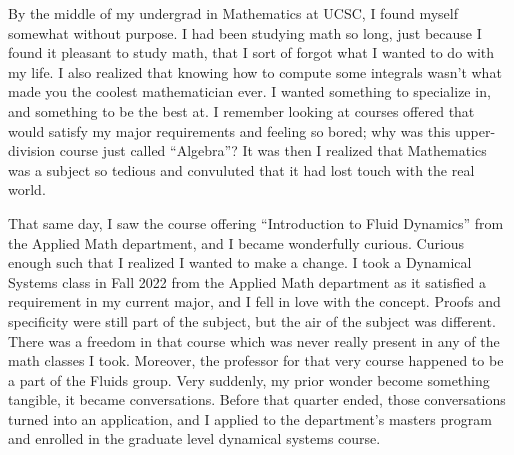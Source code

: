 \documentclass{article}
\begin{document}

By the middle of my undergrad in Mathematics at UCSC, I found myself somewhat without purpose. I had been studying math so long, just because I found it pleasant to study math, that I sort of forgot what I wanted to do with my life. I also realized that knowing how to compute some integrals wasn't what made you the coolest mathematician ever. I wanted something to specialize in, and something to be the best at. I remember looking at courses offered that would satisfy my major requirements and feeling so bored; why was this upper-division course just called ``Algebra''? It was then I realized that Mathematics was a subject so tedious and convuluted that it had lost touch with the real world. 

That same day, I saw the course offering ``Introduction to Fluid Dynamics'' from the Applied Math department, and I became wonderfully curious.  Curious enough such that I realized I wanted to make a change. I took a Dynamical Systems class in Fall 2022 from the Applied Math department as it satisfied a requirement in my current major, and I fell in love with the concept. Proofs and specificity were still part of the subject, but the air of the subject was different. There was a freedom in that course which was never really present in any of the math classes I took. Moreover, the professor for that very course happened to be a part of the Fluids group. Very suddenly, my prior wonder become something tangible, it became conversations. Before that quarter ended, those conversations turned into an application, and I applied to the department's masters program and enrolled in the graduate level dynamical systems course. 
\end{document}
